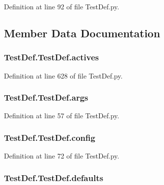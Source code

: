 Definition at line 92 of file Test\-Def.\-py.



\subsection{Member Data Documentation}
\hypertarget{class_test_def_1_1_test_def_a1eb766274fa9869e6b04e612e6d169b0}{
\subsubsection[{actives}]{\setlength{\rightskip}{0pt plus 5cm}Test\-Def.\-Test\-Def.\-actives}}\label{class_test_def_1_1_test_def_a1eb766274fa9869e6b04e612e6d169b0}


Definition at line 628 of file Test\-Def.\-py.

\hypertarget{class_test_def_1_1_test_def_a30e459036991de30822f267f1d882d44}{
\subsubsection[{args}]{\setlength{\rightskip}{0pt plus 5cm}Test\-Def.\-Test\-Def.\-args}}\label{class_test_def_1_1_test_def_a30e459036991de30822f267f1d882d44}


Definition at line 57 of file Test\-Def.\-py.

\hypertarget{class_test_def_1_1_test_def_a85a2e1fffeda060f750494dd4082594d}{
\subsubsection[{config}]{\setlength{\rightskip}{0pt plus 5cm}Test\-Def.\-Test\-Def.\-config}}\label{class_test_def_1_1_test_def_a85a2e1fffeda060f750494dd4082594d}


Definition at line 72 of file Test\-Def.\-py.

\hypertarget{class_test_def_1_1_test_def_a96d72418702f22844fc2fd5d774c7291}{
\subsubsection[{defaults}]{\setlength{\rightskip}{0pt plus 5cm}Test\-Def.\-Test\-Def.\-defaults}}\label{class_test_def_1_1_test_def_a96d72418702f22844fc2fd5d774c7291}


